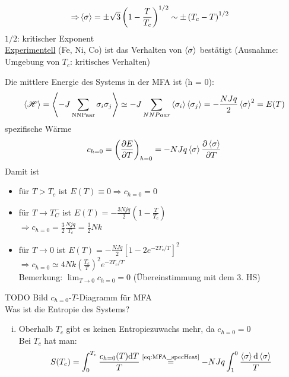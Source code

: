 \begin{enumerate}[A)]
\begin{enumerate}[i)]
\begin{equation}
\begin{split}
                \Rightarrow &\left\langle\sigma\right\rangle = \pm \sqrt{3} \left( 1 - \frac{T}{T_c} \right)^{1/2} \sim \pm \left( T_c - T \right)^{1/2}
            \end{split}
        \end{equation}
        $1/2$: kritischer Exponent \\
        \underline{Experimentell} (Fe, Ni, Co) ist das Verhalten von $\left\langle\sigma\right\rangle$ bestätigt (Ausnahme: Umgebung von $T_c$: kritisches Verhalten)
    \end{enumerate}
    Die mittlere Energie des Systems in der MFA ist (h = 0):
    \begin{equation}
        \left\langle\mathscr{H}\right\rangle = \left\langle- J \sum_\text{NNPaar} \sigma_i \sigma_j\right\rangle \simeq - J \sum_{NN Paar} \left\langle\sigma_i\right\rangle \left\langle\sigma_j\right\rangle = - \frac{N J q}{2} \left\langle\sigma\right\rangle^2 = E(T)
    \end{equation}
    spezifische Wärme
    \begin{equation}
        \label{eq:MFA_specHeat}
        c_{h=0} = \left( \frac{\partial E}{\partial T} \right)_{h=0} = - N J q \left\langle\sigma\right\rangle \frac{\partial \left\langle\sigma\right\rangle}{\partial T}
    \end{equation}
    Damit ist
    \begin{itemize}
        \item für $T > T_c$ ist $E(T) \equiv 0 \Rightarrow c_{h=0} = 0$
        \item für $T \to T_C^-$ ist $E(T) = - \frac{3 N j q}{2} \left( 1 - \frac{T}{T_c} \right)$ \\
        $\Rightarrow c_{h=0} = \frac{3}{2} \frac{N j q}{T_c} = \frac{3}{2} N k$
        \item für $T \to 0$ ist $E(T) = - \frac{N J q}{2} \left[ 1 - 2 e^{-2 T_c / T} \right]^2$ \\
        $\Rightarrow c_{h=0} \simeq 4 N k \left( \frac{T_c}{T} \right)^2 e^{-2 T_c / T}$ \\
        Bemerkung: $\lim_{T \to 0} c_{h = 0} = 0$ (Übereinstimmung mit dem 3. HS)
    \end{itemize}
    TODO Bild $c_{h=0}$-$T$-Diagramm für MFA \\ %
    Was ist die Entropie des Systems?
    \begin{enumerate}[i)]
        \item Oberhalb $T_c$ gibt es keinen Entropiezuwachs mehr, da $c_{h=0} = 0$ \\
        Bei $T_c$ hat man:
        \begin{equation}
            \begin{split}
                S(T_c) &= \int_{0}^{T_c} \frac{c_{h=0}(T) \difd T}{T} \overset{\text{\eqref{eq:MFA_specHeat}}}{=} - N J q \int_1^0 \frac{\avg{\sigma} \difd \avg{\sigma}}{T} \\

\end{split}
\end{equation}
\end{enumerate}
\end{enumerate}
